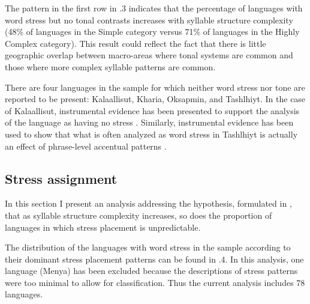   The pattern in the first row in .3 indicates that the percentage of languages with word stress but no tonal contrasts increases with syllable structure complexity (48\% of languages in the Simple category versus 71\% of languages in the Highly Complex category). This result could reflect the fact that there is little geographic overlap between macro-areas where tonal systems are common and those where more complex syllable patterns are common.

  There are four languages in the sample for which neither word stress nor tone are reported to be present: Kalaallisut, Kharia, Oksapmin, and Tashlhiyt. In the case of Kalaallisut, instrumental evidence has been presented to support the analysis of the language as having no stress \citep{Jacobsen2000}. Similarly, instrumental evidence has been used to show that what is often analyzed as word stress in Tashlhiyt is actually an effect of phrase-level accentual patterns \citep{RoettgerEtAl2015}.

\subsection{Stress assignment}\label{sec:5.4.2}

  In this section I present an analysis addressing the hypothesis, formulated in , that as syllable structure complexity increases, so does the proportion of languages in which stress placement is unpredictable.

  The distribution of the languages with word stress in the sample according to their dominant stress placement patterns can be found in .4. In this analysis, one language (Menya) has been excluded because the descriptions of stress patterns were too minimal to allow for classification. Thus the current analysis includes 78 languages.

